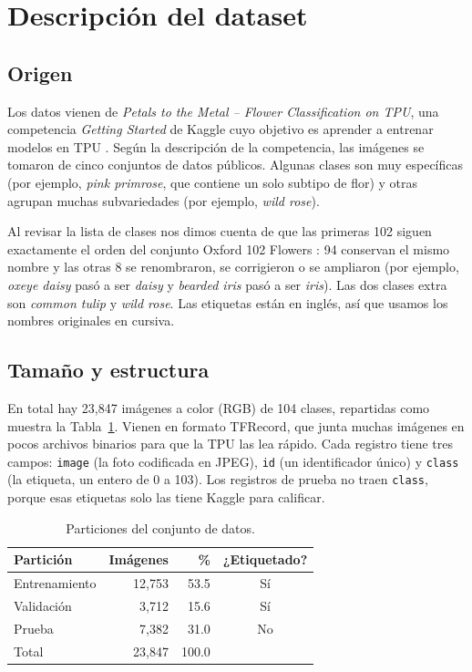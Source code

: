 \section{Descripción del dataset}
\subsection{Origen}
Los datos vienen de \textit{Petals to the Metal -- Flower Classification on TPU}, una competencia \textit{Getting Started} de Kaggle cuyo objetivo es aprender a entrenar modelos en TPU \parencite{kagglePetalsMetal}. Según la descripción de la competencia, las imágenes se tomaron de cinco conjuntos de datos públicos. Algunas clases son muy específicas (por ejemplo, \textit{pink primrose}, que contiene un solo subtipo de flor) y otras agrupan muchas subvariedades (por ejemplo, \textit{wild rose}).

Al revisar la lista de clases nos dimos cuenta de que las primeras 102 siguen exactamente el orden del conjunto Oxford 102 Flowers \parencite{nilsback2008}: 94 conservan el mismo nombre y las otras 8 se renombraron, se corrigieron o se ampliaron (por ejemplo, \textit{oxeye daisy} pasó a ser \textit{daisy} y \textit{bearded iris} pasó a ser \textit{iris}). Las dos clases extra son \textit{common tulip} y \textit{wild rose}. Las etiquetas están en inglés, así que usamos los nombres originales en cursiva.

\subsection{Tamaño y estructura}
En total hay 23,847 imágenes a color (RGB) de 104 clases, repartidas como muestra la Tabla~\ref{tab:particiones}. Vienen en formato TFRecord, que junta muchas imágenes en pocos archivos binarios para que la TPU las lea rápido. Cada registro tiene tres campos: \texttt{image} (la foto codificada en JPEG), \texttt{id} (un identificador único) y \texttt{class} (la etiqueta, un entero de 0 a 103). Los registros de prueba no traen \texttt{class}, porque esas etiquetas solo las tiene Kaggle para calificar.

\begin{table}[H]
\centering
\caption{Particiones del conjunto de datos.}
\label{tab:particiones}
\begin{tabular}{lrrc}
\toprule
Partición & Imágenes & \% & ¿Etiquetado? \\
\midrule
Entrenamiento & 12,753 & 53.5 & Sí \\
Validación    &  3,712 & 15.6 & Sí \\
Prueba        &  7,382 & 31.0 & No \\
\midrule
Total         & 23,847 & 100.0 & \\
\bottomrule
\end{tabular}
\end{table}

